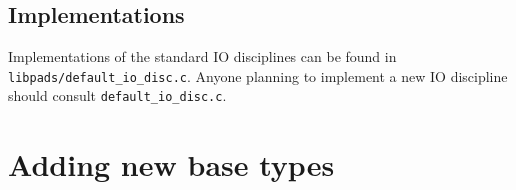 \subsection{Implementations}
Implementations of the standard IO disciplines can be found in
\texttt{libpads/default\_io\_disc.c}.  Anyone planning to implement a new IO
discipline should consult \texttt{default\_io\_disc.c}.



\section{Adding new base types}
\label{sec:library-adding-new-base-types}
